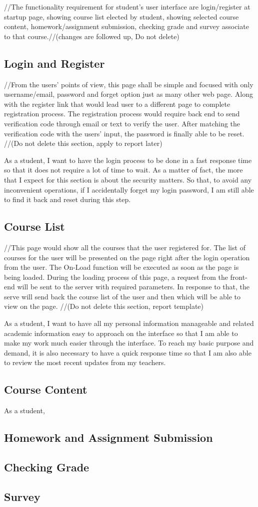 //The functionality requirement for student's user interface are login/register at startup page, showing course list elected by student, showing selected course content, homework/assignment submission, checking grade and survey associate to that course.//(changes are followed up, Do not delete)


\subsection{Login and Register}
//From the users' points of view, this page shall be simple and focused with only username/email, password and forget option just as many other web page. Along with the register link that would lead user to a different page to complete registration process. The registration process would require back end to send verification code through email or text to verify the user. After matching the verification code with the users' input, the password is finally able to be reset. //(Do not delete this section, apply to report later)


As a student, I want to have the login process to be done in a fast response time so that it does not require a lot of time to wait. As a matter of fact, the more that I expect for this section is about the security matters. So that, to avoid any inconvenient operations, if I accidentally forget my login password, I am still able to find it back and reset during this step.
\subsection{Course List}
//This page would show all the courses that the user registered for. The list of courses for the user will be presented on the page right after the login operation from the user. The On-Load function will be executed as soon as the page is being loaded. During the loading process of this page, a request from the front-end will be sent to the server with required parameters. In response to that, the serve will send back the course list of the user and then which will be able to view on the page. //(Do not delete this section, report template)


As a student, I want to have all my personal information manageable and related academic information easy to approach on the interface so that I am able to make my work much easier through the interface. To reach my basic purpose and demand, it is also necessary to have a quick response time so that I am also able to review the most recent updates from my teachers.

\subsection{Course Content}
As a student, 

\subsection{Homework and Assignment Submission}

\subsection{Checking Grade}

\subsection{Survey}